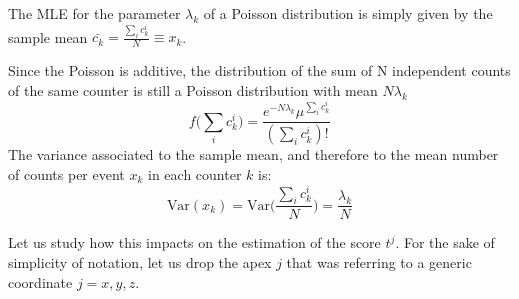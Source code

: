 The MLE for the parameter $\lambda_k$ of a Poisson distribution is simply given by the sample mean $\bar{c_k}=\tfrac{\sum_i c_k^i}{N} \equiv x_k$. 

 Since the Poisson is additive, the distribution of the sum of N independent counts of the same counter is still a Poisson distribution with mean $N\lambda_k$
 \begin{equation}
     f\bigl(\sum_i c^i_k\bigr) = \frac{e^{-N\lambda_k} \mu^{\sum_i c^i_k}}{(\sum_i c^i_k)!}
 \end{equation}
The variance associated to the sample mean, and therefore to the mean number of counts per event $x_k$ in each counter $k$ is:
\begin{equation}
    \text{Var}(x_k) =\text{Var}\biggl(\frac{\sum_i c^i_k}{N}\biggr) = \frac{\lambda_k}{N}
\end{equation}

Let us study how this impacts on the estimation of the score $t^j$. For the sake of simplicity of notation, let us drop the apex $j$ that was referring to a generic coordinate $j=x,y,z$. 

